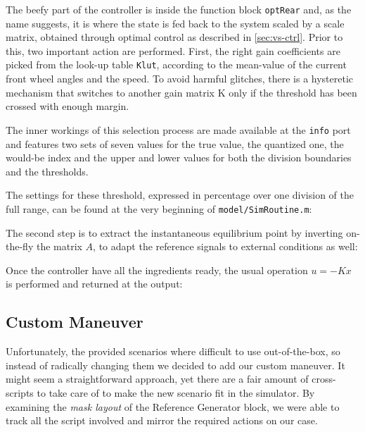 		The beefy part of the controller is inside the function block \lstinline{optRear} and, as the name suggests, it is where the state is fed back to the system scaled by a scale
		matrix, obtained through optimal control as described in \vref{sec:vs-ctrl}. Prior to this, two important action are performed.
		First, the right gain coefficients are picked from the look-up table \lstinline{Klut}, according to the mean-value of the current front wheel angles and the speed.
		To avoid harmful glitches, there is a hysteretic mechanism that switches to another gain matrix K only if the threshold has been crossed with enough margin.
		
		The inner workings of this selection process are made available at the \lstinline{info} port and features two sets of seven values for the true value, the quantized one,
		the would-be index and the upper and lower values for both the division boundaries and the thresholds.
		
		
		The settings for these threshold, expressed in percentage over one division of the full range, can be found at the very beginning of \texttt{model/SimRoutine.m}:
		
		
		The second step is to extract the instantaneous equilibrium point by inverting on-the-fly the matrix $A$, to adapt the reference signals to external conditions as well:
		
		
		Once the controller have all the ingredients ready, the usual operation $u = -Kx$ is performed and returned at the output:
		


		\subsection{Custom Maneuver}
		\label{ssec:vs-int-cm}

		Unfortunately, the provided scenarios where difficult to use out-of-the-box, so instead of radically changing them we decided to add our custom maneuver.
		It might seem a straightforward approach, yet there are a fair amount of cross-scripts to take care of to make the new scenario fit in the simulator.
		By examining the \emph{mask layout} of the Reference Generator block, we were able to track all the script involved and mirror the required actions on our case.
		
